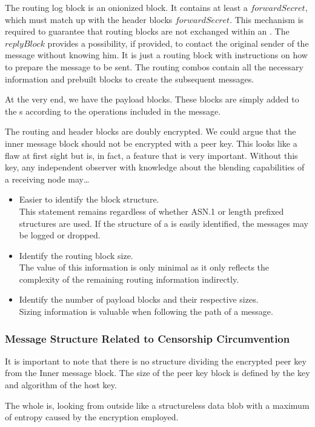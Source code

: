 The routing log block is an onionized block. It contains at least a $forwardSecret$, which must match up with the header blocks $forwardSecret$. This mechanism is required to guarantee that routing blocks are not exchanged within an . The $replyBlock$ provides a possibility, if provided, to contact the original sender of the message without knowing him. It is just a routing block with instructions on how to prepare the message to be sent. The routing combos contain all the necessary information and prebuilt blocks to create the subsequent messages.

At the very end, we have the payload blocks. These blocks are simply added to the s  according to the operations included in the message.

The routing and header blocks are doubly encrypted. We could argue that the inner message block should not be encrypted with a peer key. This looks like a flaw at first sight but is, in fact, a feature that is very important. Without this key, any independent observer with knowledge about the blending capabilities of a receiving node may\ldots
\begin{itemize}
	\item Easier to identify the block structure.\\ 
	This statement remains regardless of whether ASN.1 or length prefixed structures are used. If the structure of a \VortexMessage{} is easily identified, the messages may be logged or dropped.
	\item Identify the routing block size.\\
	The value of this information is only minimal as it only reflects the complexity of the remaining routing information indirectly.
	\item Identify the number of payload blocks and their respective sizes. \\
	Sizing information is valuable when following the path of a message.
\end{itemize}

\subsubsection{Message Structure Related to Censorship Circumvention}
It is important to note that there is no structure dividing the encrypted peer key from the Inner message block. The size of the peer key block is defined by the key and algorithm of the host key. 

The whole \VortexMessage{} is, looking from outside like a structureless data blob with a maximum of entropy caused by the encryption employed. 

